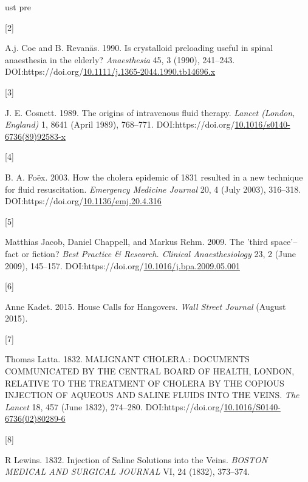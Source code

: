 \documentclass[a4paper, nobind]{templates/ociamthesis}
\newlength{\cslhangindent}
\newlength{\csllabelwidth}
\newenvironment{CSLReferences}[2] %
 {%
  \setlength{\parindent}{0pt}
  \ifodd #1
  \let\oldpar\par
  \def\par{\hangindent=\cslhangindent\oldpar}
  \fi
  \setlength{\parskip}{1mm}
  \setlength{\baselineskip}{6mm}
 }%
 {}
\newcommand{\CSLLeftMargin}[1]{\parbox[t]{\csllabelwidth}{#1}}
\newcommand{\CSLRightInline}[1]{\parbox[t]{\linewidth - \csllabelwidth}{#1}\break}
\begin{document}
\begin{CSLReferences}{0}{0}
ust pre{\hypertarget{ref-coeCrystalloidPreloadingUseful1990}{}}%
\CSLLeftMargin{{[}2{]} }
\CSLRightInline{A.j. Coe and B. Revanäs. 1990. Is crystalloid preloading useful in spinal anaesthesia in the elderly? \emph{Anaesthesia} 45, 3 (1990), 241--243. DOI:https://doi.org/\href{https://doi.org/10.1111/j.1365-2044.1990.tb14696.x}{10.1111/j.1365-2044.1990.tb14696.x}}

\leavevmode{}%
\CSLLeftMargin{{[}3{]} }
\CSLRightInline{J. E. Cosnett. 1989. The origins of intravenous fluid therapy. \emph{Lancet (London, England)} 1, 8641 (April 1989), 768--771. DOI:https://doi.org/\href{https://doi.org/10.1016/s0140-6736(89)92583-x}{10.1016/s0140-6736(89)92583-x}}

\leavevmode{}%
\CSLLeftMargin{{[}4{]} }
\CSLRightInline{B. A. Foëx. 2003. How the cholera epidemic of 1831 resulted in a new technique for fluid resuscitation. \emph{Emergency Medicine Journal} 20, 4 (July 2003), 316--318. DOI:https://doi.org/\href{https://doi.org/10.1136/emj.20.4.316}{10.1136/emj.20.4.316}}

\leavevmode{}%
\CSLLeftMargin{{[}5{]} }
\CSLRightInline{Matthias Jacob, Daniel Chappell, and Markus Rehm. 2009. The 'third space'--fact or fiction? \emph{Best Practice \& Research. Clinical Anaesthesiology} 23, 2 (June 2009), 145--157. DOI:https://doi.org/\href{https://doi.org/10.1016/j.bpa.2009.05.001}{10.1016/j.bpa.2009.05.001}}

\leavevmode{}%
\CSLLeftMargin{{[}6{]} }
\CSLRightInline{Anne Kadet. 2015. House {Calls} for {Hangovers}. \emph{Wall Street Journal} (August 2015).}

\leavevmode{}%
\CSLLeftMargin{{[}7{]} }
\CSLRightInline{Thomas Latta. 1832. {MALIGNANT CHOLERA}.: {DOCUMENTS COMMUNICATED BY THE CENTRAL BOARD OF HEALTH}, {LONDON}, {RELATIVE TO THE TREATMENT OF CHOLERA BY THE COPIOUS INJECTION OF AQUEOUS AND SALINE FLUIDS INTO THE VEINS}. \emph{The Lancet} 18, 457 (June 1832), 274--280. DOI:https://doi.org/\href{https://doi.org/10.1016/S0140-6736(02)80289-6}{10.1016/S0140-6736(02)80289-6}}

\leavevmode{}%
\CSLLeftMargin{{[}8{]} }
\CSLRightInline{R Lewins. 1832. Injection of {Saline Solutions} into the {Veins}. \emph{BOSTON MEDICAL AND SURGICAL JOURNAL} VI, 24 (1832), 373--374.}


\end{CSLReferences}
\end{document}
